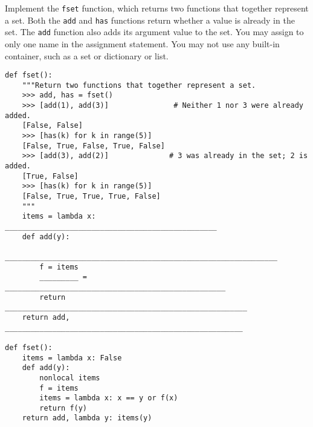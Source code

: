 \documentclass[11pt]{article}
\begin{document}
\begin{qlist}
\newpage

Implement the \texttt{fset} function, which returns two functions that together represent a set. Both the \texttt{add} and \texttt{has} functions return whether a value is already in the set. The \texttt{add} function also adds its argument value to the set. You may assign to only one name in the assignment statement. You may not use any built-in container, such as a set or dictionary or list.
\begin{verbatim}
def fset():
    """Return two functions that together represent a set.
    >>> add, has = fset()
    >>> [add(1), add(3)]               # Neither 1 nor 3 were already added.
    [False, False]
    >>> [has(k) for k in range(5)]
    [False, True, False, True, False]
    >>> [add(3), add(2)]              # 3 was already in the set; 2 is added.
    [True, False]
    >>> [has(k) for k in range(5)]
    [False, True, True, True, False]
    """
    items = lambda x: _________________________________________________
    def add(y):
        _______________________________________________________________
        f = items
        _________ = ___________________________________________________
        return ________________________________________________________
    return add, _______________________________________________________

def fset():
    items = lambda x: False
    def add(y):
        nonlocal items
        f = items
        items = lambda x: x == y or f(x)
        return f(y)
    return add, lambda y: items(y)

\end{verbatim}

\end{qlist}
\end{document}
